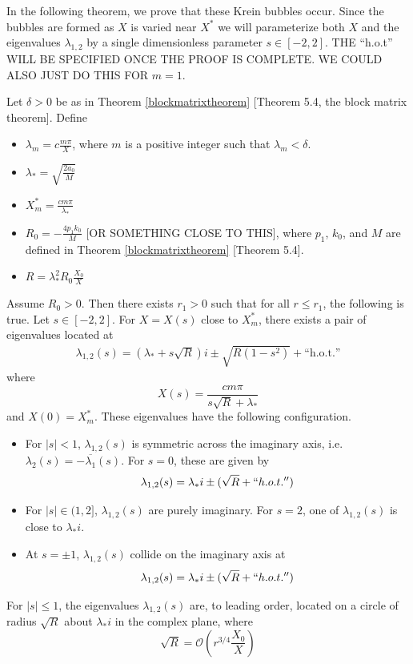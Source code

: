 \documentclass[thesis.tex]{subfiles}
\begin{document}
In the following theorem, we prove that these Krein bubbles occur. Since the bubbles are formed as $X$ is varied near $X^*$ we will parameterize both $X$ and the eigenvalues $\lambda_{1,2}$ by a single dimensionless parameter $s \in [-2, 2]$. THE ``h.o.t'' WILL BE SPECIFIED ONCE THE PROOF IS COMPLETE. WE COULD ALSO JUST DO THIS FOR $m = 1$.

\begin{theorem}\label{theorem:kreinbubbles}
Let $\delta > 0$ be as in Theorem \ref{blockmatrixtheorem} [Theorem 5.4, the block matrix theorem]. Define
\begin{itemize}
\item $\lambda_m = c \frac{m \pi}{X}$, where $m$ is a positive integer such that $\lambda_m < \delta$.
\item $\lambda_* = \sqrt{\frac{2 a_0}{M}}$
\item $X_m^* = \frac{c m \pi}{\lambda_*}$
\item $R_0 = -\frac{4 p_1 k_0}{M}$ [OR SOMETHING CLOSE TO THIS], where $p_1$, $k_0$, and $M$ are defined in Theorem \ref{blockmatrixtheorem} [Theorem 5.4].
\item $R = \lambda_*^2 R_0 \frac{X_0}{X}$ 
\end{itemize}
Assume $R_0 > 0$. Then there exists $r_1 > 0$ such that for all $r \leq r_1$, the following is true. Let $s \in [-2, 2]$. For $X = X(s)$ close to $X_m^*$, there exists a pair of eigenvalues located at
\begin{align*}
\lambda_{1,2}(s) = \left( \lambda_* + s \sqrt{R} \right) i \pm \sqrt{R(1 - s^2)} + \text{``h.o.t.''}
\end{align*}
where
\[
X(s) = \frac{c m \pi}{s \sqrt{R} + \lambda_*}
\]
and $X(0) = X_m^*$. These eigenvalues have the following configuration.
\begin{itemize}
\item For $|s| < 1$, $\lambda_{1,2}(s)$ is symmetric across the imaginary axis, i.e. $\lambda_2(s) = -\overline{\lambda_1}(s)$. For $s = 0$, these are given by
\[
\lambda_{1,2}(s) = \lambda_* i \pm (\sqrt{R} + ``h.o.t.'')
\]
\item For $|s| \in (1, 2]$, $\lambda_{1,2}(s)$
are purely imaginary. For $s = 2$, one of $\lambda_{1,2}(s)$ is close to $\lambda_* i$.
\item At $s = \pm 1$, $\lambda_{1,2}(s)$ collide on the imaginary axis at 
\[
\lambda_{1,2}(s) = \lambda_* i \pm (\sqrt{R} + ``h.o.t.'')
\]
\end{itemize}
For $|s| \leq 1$, the eigenvalues $\lambda_{1,2}(s)$ are, to leading order, located on a circle of radius $\sqrt{R}$ about $\lambda_* i$ in the complex plane, where
\[
\sqrt{R} = \mathcal{O}\left( r^{3/4}\frac{X_0}{X} \right)
\]
\end{theorem}
\end{document}
